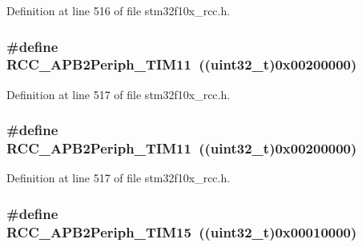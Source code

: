 Definition at line 516 of file stm32f10x\+\_\+rcc.\+h.

\subsubsection[{\texorpdfstring{R\+C\+C\+\_\+\+A\+P\+B2\+Periph\+\_\+\+T\+I\+M11}{RCC_APB2Periph_TIM11}}]{\setlength{\rightskip}{0pt plus 5cm}\#define R\+C\+C\+\_\+\+A\+P\+B2\+Periph\+\_\+\+T\+I\+M11~(({\bf uint32\+\_\+t})0x00200000)}\hypertarget{group___a_p_b2__peripheral_gaba591104f4e31b1e8ce98c269035850f}{}\label{group___a_p_b2__peripheral_gaba591104f4e31b1e8ce98c269035850f}


Definition at line 517 of file stm32f10x\+\_\+rcc.\+h.

\subsubsection[{\texorpdfstring{R\+C\+C\+\_\+\+A\+P\+B2\+Periph\+\_\+\+T\+I\+M11}{RCC_APB2Periph_TIM11}}]{\setlength{\rightskip}{0pt plus 5cm}\#define R\+C\+C\+\_\+\+A\+P\+B2\+Periph\+\_\+\+T\+I\+M11~(({\bf uint32\+\_\+t})0x00200000)}\hypertarget{group___a_p_b2__peripheral_gaba591104f4e31b1e8ce98c269035850f}{}\label{group___a_p_b2__peripheral_gaba591104f4e31b1e8ce98c269035850f}


Definition at line 517 of file stm32f10x\+\_\+rcc.\+h.

\subsubsection[{\texorpdfstring{R\+C\+C\+\_\+\+A\+P\+B2\+Periph\+\_\+\+T\+I\+M15}{RCC_APB2Periph_TIM15}}]{\setlength{\rightskip}{0pt plus 5cm}\#define R\+C\+C\+\_\+\+A\+P\+B2\+Periph\+\_\+\+T\+I\+M15~(({\bf uint32\+\_\+t})0x00010000)}\hypertarget{group___a_p_b2__peripheral_ga774f9082c3331890c06b9fd9deafe549}{}\label{group___a_p_b2__peripheral_ga774f9082c3331890c06b9fd9deafe549}


